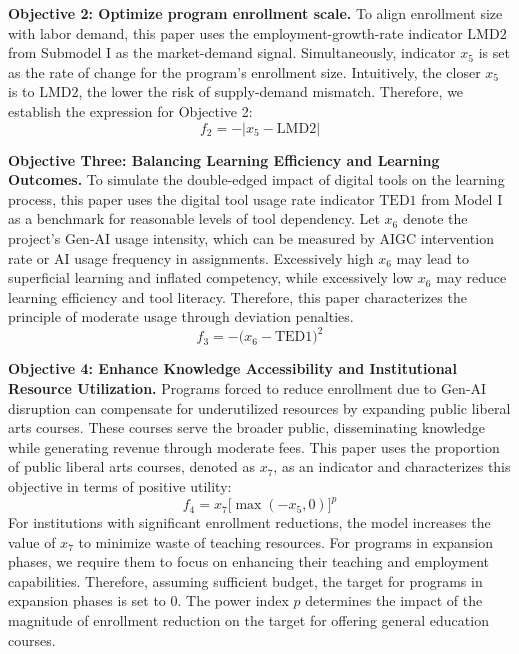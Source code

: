 \documentclass{mcmthesis}
\begin{document}
\noindent\textbf{Objective 2: Optimize program enrollment scale.}
To align enrollment size with labor demand, this paper uses the employment-growth-rate indicator $\mathrm{LMD2}$ from Submodel I as the market-demand signal. Simultaneously, indicator $x_5$ is set as the rate of change for the program's enrollment size. Intuitively, the closer $x_5$ is to $\mathrm{LMD2}$, the lower the risk of supply-demand mismatch. Therefore, we establish the expression for Objective 2:
\begin{equation}
f_2=-\bigl|x_5-\mathrm{LMD2}\bigr|
\end{equation}

\noindent\textbf{Objective Three: Balancing Learning Efficiency and Learning Outcomes.}
To simulate the double-edged impact of digital tools on the learning process, this paper uses the digital tool usage rate indicator $\mathrm{TED1}$ from Model I as a benchmark for reasonable levels of tool dependency. Let $x_6$ denote the project's Gen-AI usage intensity, which can be measured by AIGC intervention rate or AI usage frequency in assignments. Excessively high $x_6$ may lead to superficial learning and inflated competency, while excessively low $x_6$ may reduce learning efficiency and tool literacy. Therefore, this paper characterizes the principle of moderate usage through deviation penalties.
\begin{equation}
f_3=-\bigl(x_6-\mathrm{TED1}\bigr)^2
\end{equation}

\noindent\textbf{Objective 4: Enhance Knowledge Accessibility and Institutional Resource Utilization.}
Programs forced to reduce enrollment due to Gen-AI disruption can compensate for underutilized resources by expanding public liberal arts courses. These courses serve the broader public, disseminating knowledge while generating revenue through moderate fees. This paper uses the proportion of public liberal arts courses, denoted as $x_7$, as an indicator and characterizes this objective in terms of positive utility:
\begin{equation}
f_4= x_7\bigl[\max(-x_5,0)\bigr]^p
\end{equation}
For institutions with significant enrollment reductions, the model increases the value of $x_7$ to minimize waste of teaching resources. For programs in expansion phases, we require them to focus on enhancing their teaching and employment capabilities. Therefore, assuming sufficient budget, the target for programs in expansion phases is set to 0. The power index $p$ determines the impact of the magnitude of enrollment reduction on the target for offering general education courses.
\end{document}
